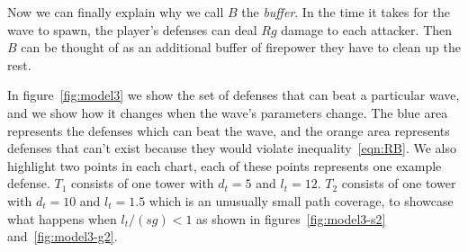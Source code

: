 Now we can finally explain why we call $B$ the \emph{buffer}.
In the time it takes for the wave to spawn, the player's defenses can deal $Rg$ damage to each attacker.
Then $B$ can be thought of as an additional buffer of firepower they have to clean up the rest.

In figure~\ref{fig:model3} we show the set of defenses that can beat a particular wave, and we show how it changes when the wave's parameters change.
The blue area represents the defenses which can beat the wave, and the orange area represents defenses that can't exist because they would violate inequality~\ref{eqn:RB}.
We also highlight two points in each chart, each of these points represents one example defense.
$T_1$ consists of one tower with $d_t=5$ and $l_t=12$.
$T_2$ consists of one tower with $d_t=10$ and $l_t=1.5$ which is an unusually small path coverage, to showcase what happens when $l_t/(sg) < 1$ as shown in figures~\ref{fig:model3-s2} and~\ref{fig:model3-g2}.

